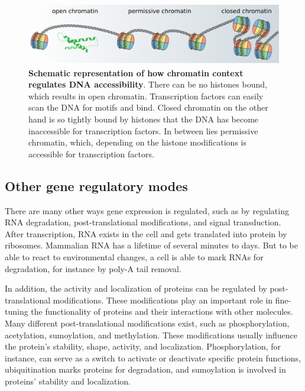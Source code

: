 \begin{figure}
    \includegraphics[width=\linewidth]{ch.introduction/imgs/accessibility_horizontal.png}
    \caption{\textbf{Schematic representation of how chromatin context regulates DNA accessibility}. There can be no histones bound, which results in open chromatin. Transcription factors can easily scan the DNA for motifs and bind. Closed chromatin on the other hand is so tightly bound by histones that the DNA has become inaccessible for transcription factors. In between lies permissive chromatin, which, depending on the histone modifications is accessible for transcription factors.}
    \label{fig:accessibility}
\end{figure}

\subsection{Other gene regulatory modes}

There are many other ways gene expression is regulated, such as by regulating RNA degradation, post-translational modifications, and signal transduction. After transcription, RNA exists in the cell and gets translated into protein by ribosomes. Mammalian RNA has a lifetime of several minutes to days\cite{Yu2001}. But to be able to react to environmental changes, a cell is able to mark RNAs for degradation, for instance by poly-A tail removal. 

In addition, the activity and localization of proteins can be regulated by post-translational modifications. These modifications play an important role in fine-tuning the functionality of proteins and their interactions with other molecules. Many different post-translational modifications exist, such as phosphorylation, acetylation, sumoylation, and methylation. These modifications usually influence the protein's stability, shape, activity, and localization. Phosphorylation, for instance, can serve as a switch to activate or deactivate specific protein functions, ubiquitination marks proteins for degradation, and sumoylation is involved in proteins' stability and localization\cite{Mazur2012}.

